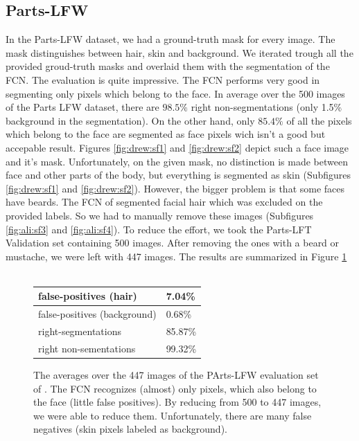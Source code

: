 \subsection{Parts-LFW}
In the Parts-LFW dataset, we had a ground-truth mask for every image. The mask distinguishes between hair, skin and background. We iterated trough all the provided groud-truth masks and overlaid them with the segmentation of the FCN. The evaluation is quite impressive. The FCN performs very good in segmenting only pixels which belong to the face. In average over the 500 images of the Parts LFW dataset, there are $98.5\%$ right non-segmentations (only 1.5\% background in the segmentation). On the other hand, only $85.4\%$ of all the pixels which belong to the face are segmented as face pixels wich isn't a good but accepable result. Figures \ref{fig:drew:sf1} and \ref{fig:drew:sf2} depict such a face image and it's mask. Unfortunately, on the given mask, no distinction is made between face and other parts of the body, but everything is segmented as skin (Subfigures \ref{fig:drew:sf1} and \ref{fig:drew:sf2}). However, the bigger problem is that some faces have beards. The FCN of \cite{nirkin2018_faceswap} segmented facial hair which was excluded on the provided labels. So we had to manually remove these images (Subfigures \ref{fig:ali:sf3} and \ref{fig:ali:sf4}). To reduce the effort, we took the Parts-LFT Validation set containing 500 images. After removing the ones with a beard or mustache, we were left with 447 images. The results are summarized in Figure \ref{fig:Parts-LFW}\\
\\
\begin{figure}
\begin{center}
\begin{tabular}{l|l} \hline
	false-positives (hair) & 7.04\%\\ \hline
	false-positives (background) & 0.68\%\\ \hline
	right-segmentations & 85.87\%\\ \hline
	right non-sementations & 99.32\% \\ \hline
\end{tabular}
\end{center}
\caption{The averages over the 447 images of the PArts-LFW evaluation set of \cite{LFW_dataset}. The FCN recognizes (almost) only pixels, which also belong to the face (little false positives). By reducing from 500 to 447 images, we were able to reduce them. Unfortunately, there are many false negatives (skin pixels labeled as background).} 
\label{fig:Parts-LFW}
\end{figure}

